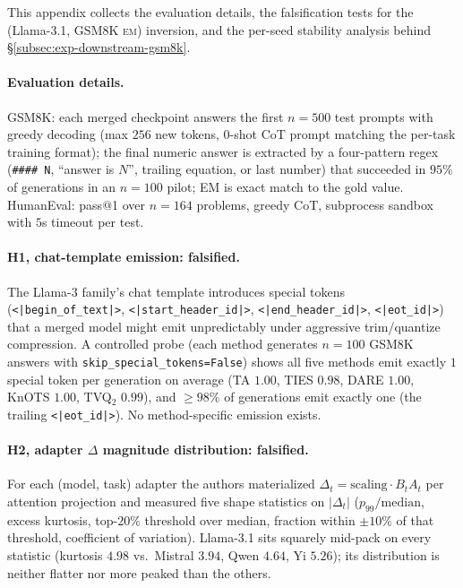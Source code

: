This appendix collects the evaluation details, the falsification tests
for the (Llama-3.1, GSM8K \textsc{em}) inversion, and the per-seed
stability analysis behind \S\ref{subsec:exp-downstream-gsm8k}.

\paragraph{Evaluation details.} GSM8K: each merged checkpoint answers
the first $n = 500$ test prompts with greedy decoding (max $256$ new
tokens, $0$-shot CoT prompt matching the per-task training format);
the final numeric answer is extracted by a four-pattern regex
(\verb|#### N|, ``answer is $N$'', trailing equation, or last number)
that succeeded in $95\%$ of generations in an $n = 100$ pilot; EM is
exact match to the gold value. HumanEval: pass@1 over $n = 164$
problems, greedy CoT, subprocess sandbox with $5$s timeout per test.

\paragraph{H1, chat-template emission: falsified.} The Llama-3
family's chat template introduces special tokens
(\verb!<|begin_of_text|>!, \verb!<|start_header_id|>!,
\verb!<|end_header_id|>!, \verb!<|eot_id|>!) that a merged model might
emit unpredictably under aggressive trim/quantize compression. A
controlled probe (each method generates $n = 100$ GSM8K answers with
\verb|skip_special_tokens=False|) shows all five methods emit exactly
$1$ special token per generation on average (TA $1.00$, TIES $0.98$,
DARE $1.00$, KnOTS $1.00$, TVQ$_2$ $0.99$), and $\geq 98\%$ of
generations emit exactly one (the trailing \verb!<|eot_id|>!). No
method-specific emission exists.

\paragraph{H2, adapter $\Delta$ magnitude distribution: falsified.}
For each (model, task) adapter the authors materialized
$\Delta_t = \mathrm{scaling}\cdot B_t A_t$ per attention projection and
measured five shape statistics on $|\Delta_t|$
($p_{99}/\mathrm{median}$, excess kurtosis, top-$20\%$ threshold over
median, fraction within $\pm 10\%$ of that threshold, coefficient of
variation). Llama-3.1 sits squarely mid-pack on every statistic
(kurtosis $4.98$ vs.\ Mistral $3.94$, Qwen $4.64$, Yi $5.26$); its
distribution is neither flatter nor more peaked than the others.

